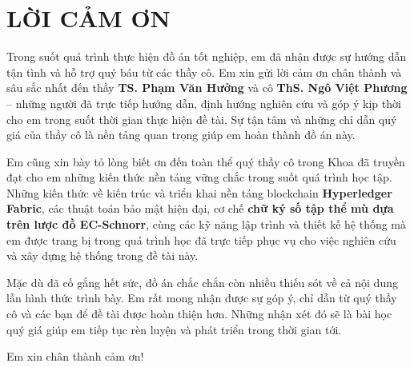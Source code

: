 \section*{LỜI CẢM ƠN}

Trong suốt quá trình thực hiện đồ án tốt nghiệp, em đã nhận được sự hướng dẫn tận tình và hỗ trợ quý báu từ các thầy cô. Em xin gửi lời cảm ơn chân thành và sâu sắc nhất đến thầy \textbf{TS. Phạm Văn Hưởng} và cô \textbf{ThS. Ngô Việt Phương} -- những người đã trực tiếp hướng dẫn, định hướng nghiên cứu và góp ý kịp thời cho em trong suốt thời gian thực hiện đề tài. Sự tận tâm và những chỉ dẫn quý giá của thầy cô là nền tảng quan trọng giúp em hoàn thành đồ án này.

Em cũng xin bày tỏ lòng biết ơn đến toàn thể quý thầy cô trong Khoa đã truyền đạt cho em những kiến thức nền tảng vững chắc trong suốt quá trình học tập. Những kiến thức về kiến trúc và triển khai nền tảng blockchain \textbf{Hyperledger Fabric}, các thuật toán bảo mật hiện đại, cơ chế \textbf{chữ ký số tập thể mù dựa trên lược đồ EC-Schnorr}, cùng các kỹ năng lập trình và thiết kế hệ thống mà em được trang bị trong quá trình học đã trực tiếp phục vụ cho việc nghiên cứu và xây dựng hệ thống trong đề tài này.

Mặc dù đã cố gắng hết sức, đồ án chắc chắn còn nhiều thiếu sót về cả nội dung lẫn hình thức trình bày. Em rất mong nhận được sự góp ý, chỉ dẫn từ quý thầy cô và các bạn để đề tài được hoàn thiện hơn. Những nhận xét đó sẽ là bài học quý giá giúp em tiếp tục rèn luyện và phát triển trong thời gian tới.

Em xin chân thành cảm ơn!

\clearpage
